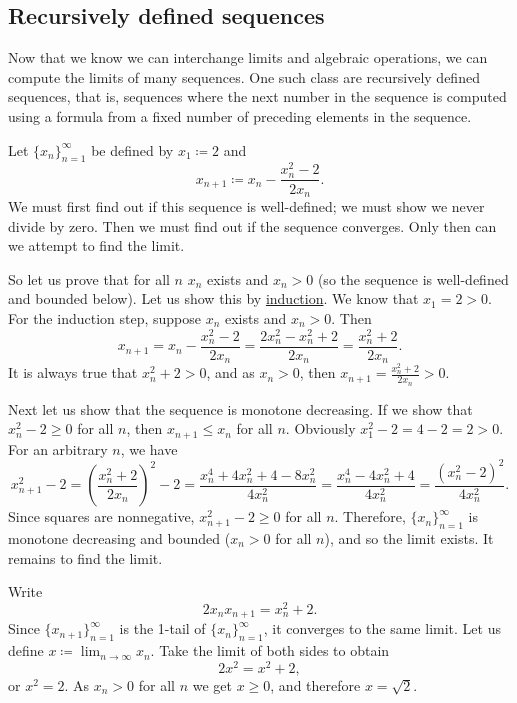 \subsection{Recursively defined sequences}

Now that we know we can interchange limits and algebraic operations, we can
compute the limits of many sequences.
One such class are recursively defined sequences, that is, sequences where
the next number in the sequence is computed using a formula from a fixed number
of preceding elements in the sequence.

\begin{example}
Let $\{ x_n \}_{n=1}^\infty$ be defined by $x_1 \coloneqq 2$ and
\begin{equation*}
x_{n+1} \coloneqq x_n - \frac{x_n^2-2}{2x_n} .
\end{equation*}
We must first find out if this sequence is well-defined; we must show we never
divide by zero.
Then we must find out if the sequence converges.  Only then
can we attempt to find the limit.

So let us prove that for all $n$ 
$x_n$ exists and $x_n > 0$
(so the sequence is well-defined and bounded below).
Let us show this by \hyperref[induction:thm]{induction}.  We know that
$x_1 = 2 > 0$.  For the induction step, suppose $x_n$ exists and
$x_n > 0$.  Then
\begin{equation*}
x_{n+1} = x_n - \frac{x_n^2-2}{2x_n} =
\frac{2x_n^2 - x_n^2+2}{2x_n} =
\frac{x_n^2+2}{2x_n} .
\end{equation*}
It is always true that $x_n^2+2 > 0$,
and as
$x_n > 0$, then $x_{n+1} = \frac{x_n^2+2}{2x_n} > 0$.

Next let us
show that the sequence is monotone decreasing.  If we show that
$x_n^2-2 \geq 0$ for all $n$, then $x_{n+1} \leq x_n$ for all $n$.
Obviously $x_1^2-2 = 4-2 = 2 > 0$.  For an arbitrary $n$, we have 
\begin{equation*}
x_{n+1}^2-2 =
{\left( \frac{x_n^2+2}{2x_n} \right)}^2 - 2
=
\frac{x_n^4+4x_n^2+4 - 8x_n^2}{4x_n^2}
=
\frac{x_n^4-4x_n^2+4}{4x_n^2}
=
\frac{{\left( x_n^2-2 \right)}^2}{4x_n^2} .
\end{equation*}
Since squares are nonnegative,
$x_{n+1}^2-2 \geq 0$ for all $n$.  Therefore,
$\{ x_n \}_{n=1}^\infty$ is monotone decreasing and bounded ($x_n > 0$ for all $n$), and 
so the limit exists.  It remains to find the limit.

Write
\begin{equation*}
2x_nx_{n+1} = x_n^2+2 .
\end{equation*}
Since $\{ x_{n+1} \}_{n=1}^\infty$ is the 1-tail of $\{ x_n \}_{n=1}^\infty$, it converges to the
same limit.  Let us define $x \coloneqq \lim_{n\to\infty} x_n$.  Take the limit of
both sides to obtain
\begin{equation*}
2x^2 = x^2+2 ,
\end{equation*}
or $x^2 = 2$.  As $x_n > 0$ for all $n$ we get $x \geq 0$, and therefore $x = \sqrt{2}$.
\end{example}

